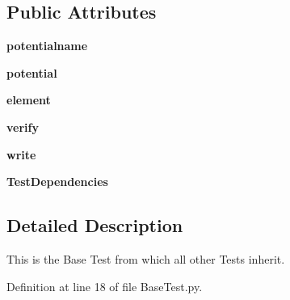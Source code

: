 \subsection*{Public Attributes}
\begin{DoxyCompactItemize}
\item 
\hypertarget{classBaseTest_1_1BaseTest_ab7dc01a5da78c687b1e3ef5695c6bb10}{
{\bfseries potentialname}}
\label{classBaseTest_1_1BaseTest_ab7dc01a5da78c687b1e3ef5695c6bb10}

\item 
\hypertarget{classBaseTest_1_1BaseTest_a0ab2e64475afb484074b0effbab3fbc4}{
{\bfseries potential}}
\label{classBaseTest_1_1BaseTest_a0ab2e64475afb484074b0effbab3fbc4}

\item 
\hypertarget{classBaseTest_1_1BaseTest_a8278580db97a9db5498314f3ea38edb9}{
{\bfseries element}}
\label{classBaseTest_1_1BaseTest_a8278580db97a9db5498314f3ea38edb9}

\item 
\hypertarget{classBaseTest_1_1BaseTest_aa4138cfb9b5dd8906a54427626525971}{
{\bfseries verify}}
\label{classBaseTest_1_1BaseTest_aa4138cfb9b5dd8906a54427626525971}

\item 
\hypertarget{classBaseTest_1_1BaseTest_a709baa7891ff3f65b10303b5bf320f88}{
{\bfseries write}}
\label{classBaseTest_1_1BaseTest_a709baa7891ff3f65b10303b5bf320f88}

\item 
\hypertarget{classBaseTest_1_1BaseTest_a9dc99538651adf4352d5e389221aa646}{
{\bfseries TestDependencies}}
\label{classBaseTest_1_1BaseTest_a9dc99538651adf4352d5e389221aa646}

\end{DoxyCompactItemize}


\subsection{Detailed Description}
\begin{DoxyVerb}This is the Base Test from which all other Tests inherit.\end{DoxyVerb}
 

Definition at line 18 of file BaseTest.py.



